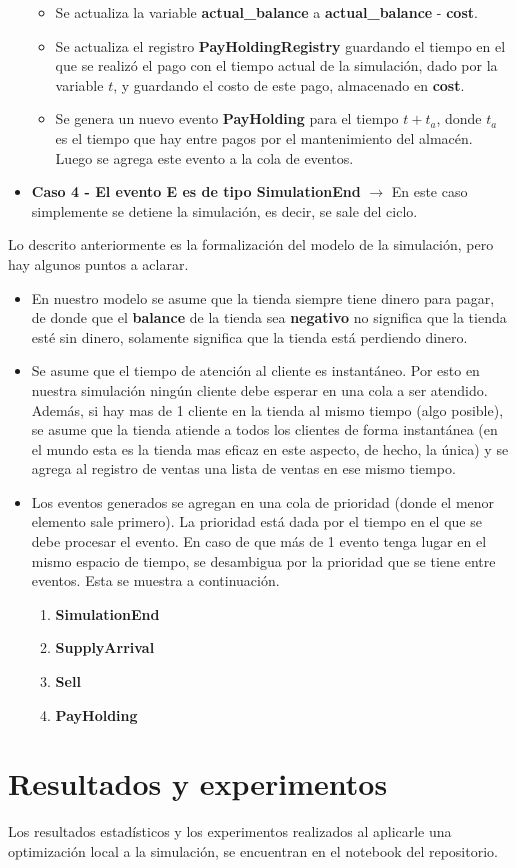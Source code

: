 \documentclass{article}
\begin{document}
\begin{itemize}
\begin{itemize}
        \item Se actualiza la variable \textbf{actual\_balance} a \textbf{actual\_balance} - \textbf{cost}.
        \item Se actualiza el registro \textbf{PayHoldingRegistry} guardando el tiempo en el que se realizó el pago con el tiempo actual de la simulación, dado por la variable $t$, y guardando el costo de este pago, almacenado en \textbf{cost}.
        \item Se genera un nuevo evento \textbf{PayHolding} para el tiempo $t + t_a$, donde $t_a$ es el tiempo que hay entre pagos por el mantenimiento del almacén. Luego se agrega este evento a la cola de eventos.
    \end{itemize}
    \item \textbf{Caso 4 - El evento E es de tipo SimulationEnd} $\to$ En este caso simplemente se detiene la simulación, es decir, se sale del ciclo.
\end{itemize}

Lo descrito anteriormente es la formalización del modelo de la simulación, pero hay algunos puntos a aclarar.
\begin{itemize}
    \item En nuestro modelo se asume que la tienda siempre tiene dinero para pagar, de donde que el \textbf{balance} de la tienda sea \textbf{negativo} no significa que la tienda esté sin dinero, solamente significa que la tienda está perdiendo dinero.
    \item Se asume que el tiempo de atención al cliente es instantáneo. Por esto en nuestra simulación ningún cliente debe esperar en una cola a ser atendido. Además, si hay mas de 1 cliente en la tienda al mismo tiempo (algo posible), se asume que la tienda atiende a todos los clientes de forma instantánea (en el mundo esta es la tienda mas eficaz en este aspecto, de hecho, la única) y se agrega al registro de ventas una lista de ventas en ese mismo tiempo.
    \item Los eventos generados se agregan en una cola de prioridad (donde el menor elemento sale primero). La prioridad está dada por el tiempo en el que se debe procesar el evento. En caso de que más de 1 evento tenga lugar en el mismo espacio de tiempo, se desambigua por la prioridad que se tiene entre eventos. Esta se muestra a continuación.
    \begin{enumerate}
        \item \textbf{SimulationEnd}
        \item \textbf{SupplyArrival}
        \item \textbf{Sell}
        \item \textbf{PayHolding}
    \end{enumerate}
\end{itemize}

\section{Resultados y experimentos}

Los resultados estadísticos y los experimentos realizados al aplicarle una optimización local
a la simulación, se encuentran en el notebook del repositorio.
\end{document}
